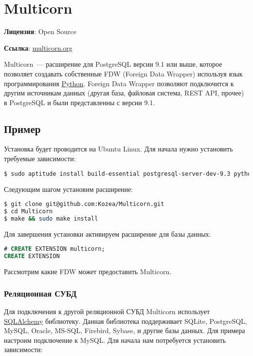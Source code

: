 \section{Multicorn}
\textbf{Лицензия}: Open Source

\textbf{Ссылка}: \href{http://multicorn.org/}{multicorn.org}

Multicorn~--- расширение для PostgreSQL версии 9.1 или выше, которое позволяет создавать собственные FDW (Foreign Data Wrapper) используя язык программирования \href{https://www.python.org/}{Python}. Foreign Data Wrapper позволяют подключится к другим источникам данных (другая база, файловая система, REST API, прочее) в PostgreSQL и были представленны с версии 9.1.


\subsection{Пример}

Установка будет проводится на Ubuntu Linux. Для начала нужно установить требуемые зависимости:

\begin{lstlisting}[language=Bash,label=lst:pgmulticorn1,caption=Multicorn]
$ sudo aptitude install build-essential postgresql-server-dev-9.3 python-dev python-setuptools
\end{lstlisting}

Следующим шагом установим расширение:

\begin{lstlisting}[language=Bash,label=lst:pgmulticorn2,caption=Multicorn]
$ git clone git@github.com:Kozea/Multicorn.git
$ cd Multicorn
$ make && sudo make install
\end{lstlisting}

Для завершения установки активируем расширение для базы данных:

\begin{lstlisting}[language=SQL,label=lst:pgmulticorn3,caption=Multicorn]
# CREATE EXTENSION multicorn;
CREATE EXTENSION
\end{lstlisting}

Рассмотрим какие FDW может предоставить Multicorn.


\subsubsection{Реляционная СУБД}

Для подключения к другой реляционной СУБД Multicorn использует \href{http://www.sqlalchemy.org/}{SQLAlchemy} библиотеку. Данная библиотека поддерживает SQLite, PostgreSQL, MySQL, Oracle, MS-SQL, Firebird, Sybase, и другие базы данных. Для примера настроим подключение к MySQL. Для начала нам потребуется установить зависимости:

